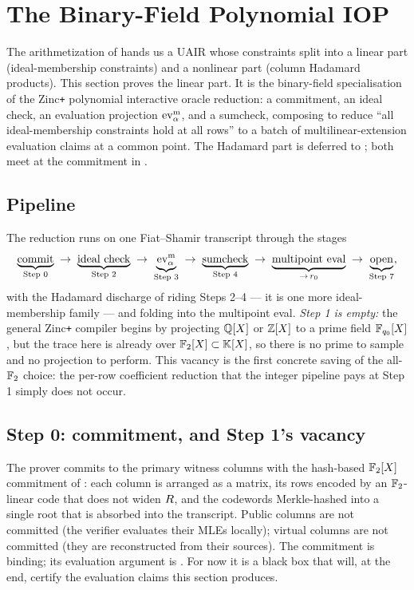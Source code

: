 \section{The Binary-Field Polynomial IOP}
\label{sec:piop}

The arithmetization of  hands us a UAIR whose constraints
split into a linear part (ideal-membership constraints) and a nonlinear
part (column Hadamard products). This section proves the linear part. It
is the binary-field specialisation of the Zinc\texttt{+} polynomial
interactive oracle reduction: a commitment, an ideal check, an evaluation
projection $\operatorname{ev}^{\mathrm{m}}_{\alpha}$, and a sumcheck, composing to reduce ``all
ideal-membership constraints hold at all rows'' to a batch of
multilinear-extension evaluation claims at a common point. The Hadamard
part is deferred to ; both meet at the commitment in
.

\subsection{Pipeline}
\label{sec:pipeline}

The reduction runs on one Fiat--Shamir transcript through the stages
\[
  \underbrace{\text{commit}}_{\text{Step 0}}
  \;\to\;
  \underbrace{\text{ideal check}}_{\text{Step 2}}
  \;\to\;
  \underbrace{\operatorname{ev}^{\mathrm{m}}_{\alpha}}_{\text{Step 3}}
  \;\to\;
  \underbrace{\text{sumcheck}}_{\text{Step 4}}
  \;\to\;
  \underbrace{\text{multipoint eval}}_{\to\, r_0}
  \;\to\;
  \underbrace{\text{open}}_{\text{Step 7}},
\]
with the Hadamard discharge of  riding Steps 2--4 ---
it is one more ideal-membership family --- and folding into the multipoint
eval. \emph{Step 1 is empty:} the
general Zinc\texttt{+} compiler begins by projecting $\mathbb{Q}[X]$ or $\mathbb{Z}[X]$ to
a prime field $\mathbb{F}_{q_0}[X]$, but the trace here is already over
$\mathbb{F}_2[X]\subset\mathbb{K}[X]$, so there is no prime to sample and no projection
to perform. This vacancy is the first concrete saving of the all-$\mathbb{F}_2$
choice: the per-row coefficient reduction that the integer pipeline pays
at Step 1 simply does not occur.

\subsection{Step 0: commitment, and Step 1's vacancy}
\label{sec:commit-step}

The prover commits to the primary witness columns with the hash-based
$\mathbb{F}_2[X]$ commitment of : each column is arranged as
a matrix, its rows encoded by an $\mathbb{F}_2$-linear code that does not widen
$R$, and the codewords Merkle-hashed into a single root that is
absorbed into the transcript. Public columns are not committed (the
verifier evaluates their MLEs locally); virtual columns are not committed
(they are reconstructed from their sources). The commitment is binding;
its evaluation argument is . For now it is a black
box that will, at the end, certify the evaluation claims this section
produces.

